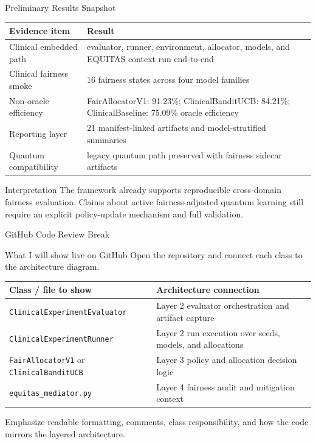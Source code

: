\documentclass[aspectratio=169,10pt]{beamer}
\begin{document}
\begin{frame}{Preliminary Results Snapshot}
\begin{center}
\begin{tabular}{p{}p{}}
\toprule
Evidence item & Result \\
\midrule
Clinical embedded path & evaluator, runner, environment, allocator, models, and EQUITAS context run end-to-end \\
Clinical fairness smoke & 16 fairness states across four model families \\
Non-oracle efficiency & FairAllocatorV1: 91.23\%; ClinicalBanditUCB: 84.21\%; ClinicalBaseline: 75.09\% oracle efficiency \\
Reporting layer & 21 manifest-linked artifacts and model-stratified summaries \\
Quantum compatibility & legacy quantum path preserved with fairness sidecar artifacts \\
\bottomrule
\end{tabular}
\end{center}
\vspace{0.35em}
\begin{block}{Interpretation}
The framework already supports reproducible cross-domain fairness evaluation. Claims about active fairness-adjusted quantum learning still require an explicit policy-update mechanism and full validation.
\end{block}
\end{frame}

\begin{frame}{GitHub Code Review Break}
\begin{block}{What I will show live on GitHub}
Open the repository and connect each class to the architecture diagram.
\end{block}
\begin{center}
\small
\begin{tabular}{p{}p{}}
\toprule
Class / file to show & Architecture connection \\
\midrule
\texttt{ClinicalExperimentEvaluator} & Layer 2 evaluator orchestration and artifact capture \\
\texttt{ClinicalExperimentRunner} & Layer 2 run execution over seeds, models, and allocations \\
\texttt{FairAllocatorV1} or \texttt{ClinicalBanditUCB} & Layer 3 policy and allocation decision logic \\
\texttt{equitas\_mediator.py} & Layer 4 fairness audit and mitigation context \\
\bottomrule
\end{tabular}
\end{center}
\vspace{0.4em}
\small Emphasize readable formatting, comments, class responsibility, and how the code mirrors the layered architecture.
\end{frame}
\end{document}
